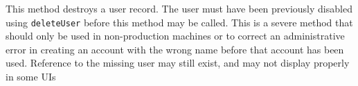 This method destroys a user record. The user must have been previously disabled using \verb+deleteUser+ before this method 
may be called. This is a severe method that should only be used in non-production machines or to correct an administrative
error in creating an account with the wrong name before that account has been used. Reference to the missing user may still
exist, and may not display properly in some UIs
